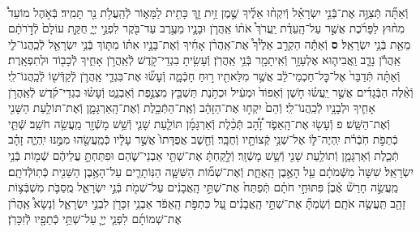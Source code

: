 \documentclass[twoside, openany, parskip=half, 11pt]{book}
\begin{document}
\begin{footnotesize}
\begin{multicols}{2}
\\
וְֿאַתָּ֞ה תְּֿצַוֶּ֣ה אֶת־בְּֿנֵ֣י יִשְׂרָאֵ֗ל וְֿיִקְח֨וּ אֵלֶ֜יךָ שֶׁ֣מֶן זַ֥יִת זָ֛ךְ כָּתִ֖ית לַמָּא֑וֹר לְֿהַֽעֲלֹ֥ת נֵ֖ר תָּמִֽיד׃ בְּֿאֹ֣הֶל מוֹעֵד֩ מִח֨וּץ לַפָּרֹ֜כֶת אֲשֶׁ֣ר עַל־הָֽעֵדֻ֗ת יַֽעֲרֹךְ֩ אֹת֨וֹ אַֽהֲרֹ֧ן וּבָנָ֛יו מֵעֶ֥רֶב עַד־בֹּ֖קֶר לִפְנֵ֣י יְיָ֑ חֻקַּ֤ת עוֹלָם֙ לְֿדֹ֣רֹתָ֔ם מֵאֵ֖ת בְּֿנֵ֥י יִשְׂרָאֵֽל׃ \textbf{ס} וְֿאַתָּ֡ה הַקְרֵ֣ב אֵלֶ֩יךָ֩ אֶת־אַֽהֲרֹ֨ן אָחִ֜יךָ וְֿאֶת־בָּנָ֣יו אִתּ֗וֹ מִתּ֛וֹךְ בְּֿנֵ֥י יִשְׂרָאֵ֖ל לְֿכַֽהֲנוֹ־לִ֑י אַֽהֲרֹ֕ן נָדָ֧ב וַֽאֲבִיה֛וּא אֶלְעָזָ֥ר וְֿאִֽיתָמָ֖ר בְּֿנֵ֥י אַֽהֲרֹֽן׃ וְֿעָשִׂ֥יתָ בִגְדֵי־קֹ֖דֶשׁ לְֿאַֽהֲרֹ֣ן אָחִ֑יךָ לְֿכָב֖וֹד וּלְתִפְאָֽרֶת׃
וְֿאַתָּ֗ה תְּֿדַבֵּר֙ אֶל־כׇּל־חַכְמֵי־לֵ֔ב אֲשֶׁ֥ר מִלֵּאתִ֖יו ר֣וּחַ חָכְֿמָ֑ה וְֿעָשׂ֞וּ אֶת־בִּגְדֵ֧י אַֽהֲרֹ֛ן לְֿקַדְּֿשׁ֖וֹ לְֿכַֽהֲנוֹ־לִֽי׃ וְֿאֵ֨לֶּה הַבְּֿגָדִ֜ים אֲשֶׁ֣ר יַֽעֲשׂ֗וּ חֹ֤שֶׁן וְֿאֵפוֹד֙ וּמְעִ֔יל וּכְתֹ֥נֶת תַּשְׁבֵּ֖ץ מִצְנֶ֣פֶת וְֿאַבְנֵ֑ט וְֿעָשׂ֨וּ בִגְדֵי־קֹ֜דֶשׁ לְֿאַֽהֲרֹ֥ן אָחִ֛יךָ וּלְבָנָ֖יו לְֿכַֽהֲנוֹ־לִֽי׃ וְֿהֵם֙ יִקְח֣וּ אֶת־הַזָּהָ֔ב וְֿאֶֽת־הַתְּֿכֵ֖לֶת וְֿאֶת־הָֽאַרְגָּמָ֑ן וְֿאֶת־תּוֹלַ֥עַת הַשָּׁנִ֖י וְֿאֶת־הַשֵּֽׁשׁ׃ פ
וְֿעָשׂ֖וּ אֶת־הָֽאֵפֹ֑ד זָ֠הָ֠ב תְּֿכֵ֨לֶת וְֿאַרְגָּמָ֜ן תּוֹלַ֧עַת שָׁנִ֛י וְֿשֵׁ֥שׁ מָשְֿׁזָ֖ר מַֽעֲשֵׂ֥ה חֹשֵֽׁב׃ שְֿׁתֵּ֧י כְֿתֵפֹ֣ת חֹֽבְֿרֹ֗ת יִֽהְיֶה־לּ֛וֹ אֶל־שְׁנֵ֥י קְֿצוֹתָ֖יו וְֿחֻבָּֽר׃ וְֿחֵ֤שֶׁב אֲפֻדָּתוֹ֙ אֲשֶׁ֣ר עָלָ֔יו כְּֿמַֽעֲשֵׂ֖הוּ מִמֶּ֣נּוּ יִֽהְיֶ֑ה זָהָ֗ב תְּֿכֵ֧לֶת וְֿאַרְגָּמָ֛ן וְֿתוֹלַ֥עַת שָׁנִ֖י וְֿשֵׁ֥שׁ מָשְֿׁזָֽר׃ וְֿלָ֣קַחְתָּ֔ אֶת־שְׁתֵּ֖י אַבְנֵי־שֹׁ֑הַם וּפִתַּחְתָּ֣ עֲלֵיהֶ֔ם שְֿׁמ֖וֹת בְּֿנֵ֥י יִשְׂרָאֵֽל׃
שִׁשָּׁה֙ מִשְּֿׁמֹתָ֔ם עַ֖ל הָאֶ֣בֶן הָֽאֶחָ֑ת וְֿאֶת־שְׁמ֞וֹת הַשִּׁשָּׁ֧ה הַנּֽוֹתָרִ֛ים עַל־הָאֶ֥בֶן הַשֵּׁנִ֖ית כְּֿתֽוֹלְֿדֹתָֽם׃ מַֽעֲשֵׂ֣ה חָרַשׁ֘ אֶ֒בֶן֒ פִּתּוּחֵ֣י חֹתָ֗ם תְּֿפַתַּח֙ אֶת־שְׁתֵּ֣י הָֽאֲבָנִ֔ים עַל־שְׁמֹ֖ת בְּֿנֵ֣י יִשְׂרָאֵ֑ל מֻֽסַבֹּ֛ת מִשְׁבְּֿצ֥וֹת זָהָ֖ב תַּֽעֲשֶׂ֥ה אֹתָֽם׃ וְֿשַׂמְתָּ֞ אֶת־שְׁתֵּ֣י הָֽאֲבָנִ֗ים עַ֚ל כִּתְפֹ֣ת הָֽאֵפֹ֔ד אַבְנֵ֥י זִכָּרֹ֖ן לִבְנֵ֣י יִשְׂרָאֵ֑ל וְֿנָשָׂא֩ אַֽהֲרֹ֨ן אֶת־שְׁמוֹתָ֜ם לִפְנֵ֧י יְיָ֛ עַל־שְׁתֵּ֥י כְֿתֵפָ֖יו לְֿזִכָּרֹֽן׃


\end{multicols}
\end{footnotesize}
\end{document}
